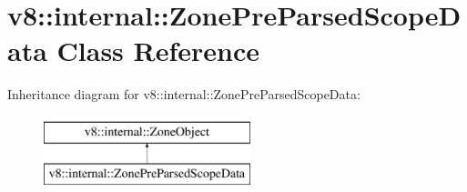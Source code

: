 \hypertarget{classv8_1_1internal_1_1ZonePreParsedScopeData}{}\section{v8\+:\+:internal\+:\+:Zone\+Pre\+Parsed\+Scope\+Data Class Reference}
\label{classv8_1_1internal_1_1ZonePreParsedScopeData}
Inheritance diagram for v8\+:\+:internal\+:\+:Zone\+Pre\+Parsed\+Scope\+Data\+:\begin{figure}[H]
\begin{center}
\leavevmode
\includegraphics[height=2.000000cm]{classv8_1_1internal_1_1ZonePreParsedScopeData}
\end{center}
\end{figure}
